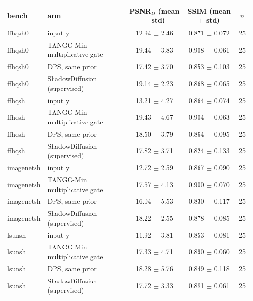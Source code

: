\begin{tabular}{llccc}
\toprule
bench & arm & PSNR$_\Omega$ (mean $\pm$ std) & SSIM (mean $\pm$ std) & $n$\\
\midrule
ffhqsh0 & input y & 12.94 $\pm$ 2.46 & 0.871 $\pm$ 0.072 & 25\\
ffhqsh0 & TANGO-Min multiplicative gate & 19.44 $\pm$ 3.83 & 0.908 $\pm$ 0.061 & 25\\
ffhqsh0 & DPS, same prior & 17.42 $\pm$ 3.70 & 0.853 $\pm$ 0.103 & 25\\
ffhqsh0 & ShadowDiffusion (supervised) & 19.14 $\pm$ 2.23 & 0.868 $\pm$ 0.065 & 25\\
\midrule
ffhqsh & input y & 13.21 $\pm$ 4.27 & 0.864 $\pm$ 0.074 & 25\\
ffhqsh & TANGO-Min multiplicative gate & 19.43 $\pm$ 4.67 & 0.904 $\pm$ 0.063 & 25\\
ffhqsh & DPS, same prior & 18.50 $\pm$ 3.79 & 0.864 $\pm$ 0.095 & 25\\
ffhqsh & ShadowDiffusion (supervised) & 17.82 $\pm$ 3.71 & 0.824 $\pm$ 0.133 & 25\\
\midrule
imagenetsh & input y & 12.72 $\pm$ 2.59 & 0.867 $\pm$ 0.090 & 25\\
imagenetsh & TANGO-Min multiplicative gate & 17.67 $\pm$ 4.13 & 0.900 $\pm$ 0.070 & 25\\
imagenetsh & DPS, same prior & 16.04 $\pm$ 5.53 & 0.830 $\pm$ 0.117 & 25\\
imagenetsh & ShadowDiffusion (supervised) & 18.22 $\pm$ 2.55 & 0.878 $\pm$ 0.085 & 25\\
\midrule
lsunsh & input y & 11.92 $\pm$ 3.81 & 0.853 $\pm$ 0.081 & 25\\
lsunsh & TANGO-Min multiplicative gate & 17.33 $\pm$ 4.71 & 0.890 $\pm$ 0.060 & 25\\
lsunsh & DPS, same prior & 18.28 $\pm$ 5.76 & 0.849 $\pm$ 0.118 & 25\\
lsunsh & ShadowDiffusion (supervised) & 17.72 $\pm$ 3.33 & 0.881 $\pm$ 0.061 & 25\\
\bottomrule
\end{tabular}
